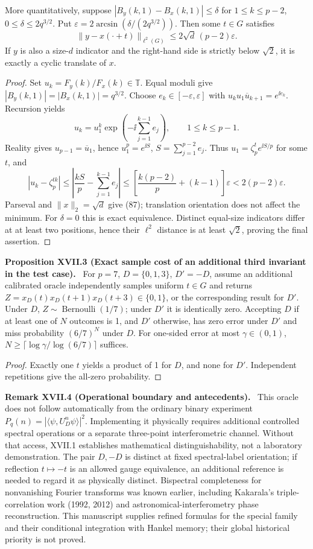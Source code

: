 \documentclass[11pt,a4paper,oneside]{book}
\newcommand{\statement}[3]{\par\medskip\noindent\textbf{#1 #2 (#3).}\ }
\begin{document}
More quantitatively, suppose $|B_y(k,1)-B_x(k,1)|\le\delta$ for $1\le k\le p-2$, $0\le\delta\le2q^{3/2}$. Put $\varepsilon=2\arcsin(\delta/(2q^{3/2}))$. Then some $t\in G$ satisfies
\begin{equation}\|y-x(\cdot+t)\|_{\ell^2(G)}\le2\sqrt d\,(p-2)\varepsilon.\tag{87}\end{equation}
If $y$ is also a size-$d$ indicator and the right-hand side is strictly below $\sqrt2$, it is exactly a cyclic translate of $x$.
\begin{proof}Set $u_k=F_y(k)/F_x(k)\in\mathbb T$. Equal moduli give $|B_y(k,1)|=|B_x(k,1)|=q^{3/2}$. Choose $e_k\in[-\varepsilon,\varepsilon]$ with $u_ku_1\overline u_{k+1}=e^{\ii e_k}$. Recursion yields
\[u_k=u_1^k\exp\left(-\ii\sum_{j=1}^{k-1}e_j\right),\qquad1\le k\le p-1.\]
Reality gives $u_{p-1}=\overline u_1$, hence $u_1^p=e^{\ii S}$, $S=\sum_{j=1}^{p-2}e_j$. Thus $u_1=\zeta_p^te^{\ii S/p}$ for some $t$, and
\[|u_k-\zeta_p^{tk}|\le\left|\frac{kS}p-\sum_{j=1}^{k-1}e_j\right|\le\left[\frac{k(p-2)}p+(k-1)\right]\varepsilon<2(p-2)\varepsilon.\]
Parseval and $\|x\|_2=\sqrt d$ give (87); translation orientation does not affect the minimum. For $\delta=0$ this is exact equivalence. Distinct equal-size indicators differ at at least two positions, hence their $\ell^2$ distance is at least $\sqrt2$, proving the final assertion.\end{proof}
\statement{Proposition}{XVII.3}{Exact sample cost of an additional third invariant in the test case} For $p=7$, $D=\{0,1,3\}$, $D'=-D$, assume an additional calibrated oracle independently samples uniform $t\in G$ and returns $Z=x_D(t)x_D(t+1)x_D(t+3)\in\{0,1\}$, or the corresponding result for $D'$. Under $D$, $Z\sim\operatorname{Bernoulli}(1/7)$; under $D'$ it is identically zero. Accepting $D$ if at least one of $N$ outcomes is 1, and $D'$ otherwise, has zero error under $D'$ and miss probability $(6/7)^N$ under $D$. For one-sided error at most $\gamma\in(0,1)$, $N\ge\lceil\log\gamma/\log(6/7)\rceil$ suffices.
\begin{proof}Exactly one $t$ yields a product of 1 for $D$, and none for $D'$. Independent repetitions give the all-zero probability.\end{proof}
\statement{Remark}{XVII.4}{Operational boundary and antecedents} This oracle does not follow automatically from the ordinary binary experiment $P_q(n)=|\langle\psi,U_D^n\psi\rangle|^2$. Implementing it physically requires additional controlled spectral operations or a separate three-point interferometric channel. Without that access, XVII.1 establishes mathematical distinguishability, not a laboratory demonstration. The pair $D,-D$ is distinct at fixed spectral-label orientation; if reflection $t\mapsto-t$ is an allowed gauge equivalence, an additional reference is needed to regard it as physically distinct. Bispectral completeness for nonvanishing Fourier transforms was known earlier, including Kakarala's triple-correlation work (1992, 2012) and astronomical-interferometry phase reconstruction. This manuscript supplies refined formulas for the special family and their conditional integration with Hankel memory; their global historical priority is not proved.
\end{document}
